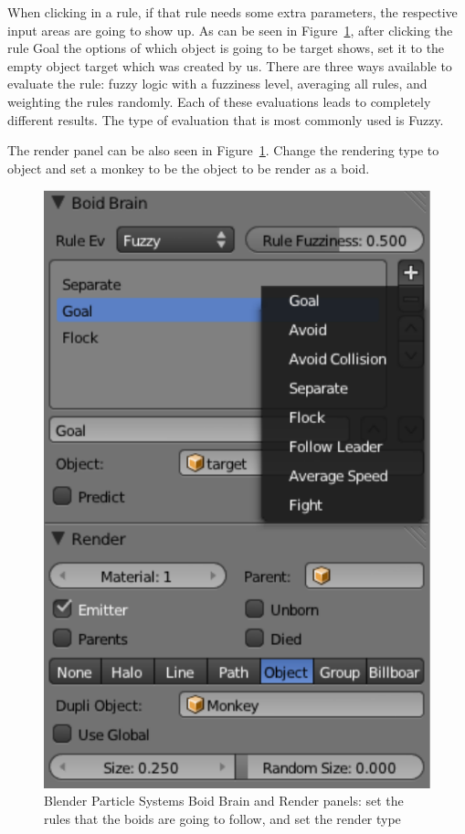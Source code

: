 When clicking in a rule, if that rule needs some extra parameters, the respective input areas are going to show up. As can be seen in Figure~\ref{boidsBrain}, after clicking the rule Goal the options of which object is going to be target shows, set it to the empty object target which was created by us. There are three ways available to evaluate the rule: fuzzy logic with a fuzziness level, averaging all rules, and weighting the rules randomly. Each of these evaluations leads to completely different results. The type of evaluation that is most commonly used is Fuzzy.

The render panel can be also seen in Figure~\ref{boidsBrain}. Change the rendering type to object and set a monkey to be the object to be render as a boid.

\begin{figure}[htbp]
\begin{center}
\includegraphics[scale = 0.5]{figures/boidsBrain.pdf}
\caption{Blender Particle Systems Boid Brain and Render panels: set the rules that the boids are going to follow, and set the render type}
\label{boidsBrain}
\end{center}
\end{figure}

